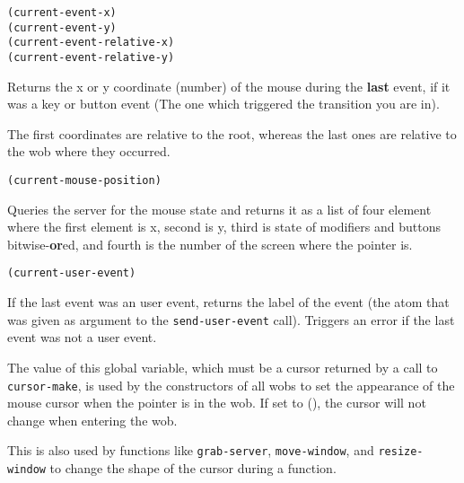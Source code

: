         
{\usagefont\begin{verbatim}
(current-event-x)
(current-event-y)
(current-event-relative-x)
(current-event-relative-y)
\end{verbatim}}\usageupspace

Returns the x or y coordinate (number)  of the mouse during the {\bf last}
event, if it was a key or button event (The one which triggered the
transition you are in).

The first coordinates are relative to the root, whereas the last ones are
relative to the wob where they occurred.

        
{\usagefont\begin{verbatim}
(current-mouse-position)
\end{verbatim}}\usageupspace

Queries the server for the mouse state and returns it as a list of
four element where the first element is x, second is y, third is
state of modifiers and buttons bitwise-{\bf or}ed, and fourth
is the number of the screen where the pointer is.


{\usagefont\begin{verbatim}
(current-user-event)
\end{verbatim}}\usageupspace

If the last event was an user event, returns the label of the event (the
atom that was given as argument to the \verb"send-user-event" call).
Triggers an error if the last event was not a user event.

        

The value of this global variable, which must be a cursor returned by a call
to \verb"cursor-make", is used by the constructors of all wobs to set the
appearance of the mouse cursor when the pointer is in the wob. If set to (),
the cursor will not change when entering the wob.

This is also used by functions like \verb"grab-server", \verb"move-window",
and \verb"resize-window" to change the shape of the cursor during a function.

